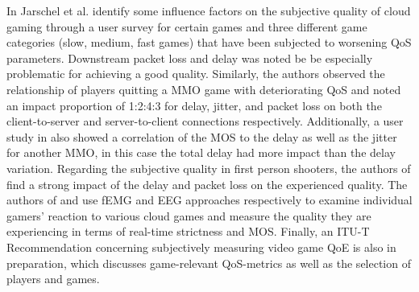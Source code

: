 In \cite{5976180} Jarschel et al. identify some influence factors on the subjective quality of cloud gaming through a user survey for certain games and three different game categories (slow, medium, fast games) that have been subjected to worsening \gls{QoS} parameters. Downstream packet loss and delay was noted be be especially problematic for achieving a good quality. Similarly, the authors \cite{4591393} observed the relationship of players quitting a \gls{MMO} game with deteriorating \gls{QoS} and noted an impact proportion of 1:2:4:3 for delay, jitter, and packet loss on both the client-to-server and server-to-client connections respectively. Additionally, a user study in \cite{4604397} also showed a correlation of the \gls{MOS} to the delay as well as the jitter for another \gls{MMO}, in this case the total delay had more impact than the delay variation. Regarding the subjective quality in first person shooters, the authors of \cite{6614351} find a strong impact of the delay and packet loss on the experienced quality. The authors of \cite{6404025} and \cite{beyerusing} use \gls{fEMG} and \gls{EEG} approaches respectively to examine individual gamers' reaction to various cloud games and measure the quality they are experiencing in terms of real-time strictness and \gls{MOS}. Finally, an ITU-T Recommendation \cite{mollertowards} concerning subjectively measuring video game \gls{QoE} is also in preparation, which discusses game-relevant \gls{QoS}-metrics as well as the selection of players and games.

